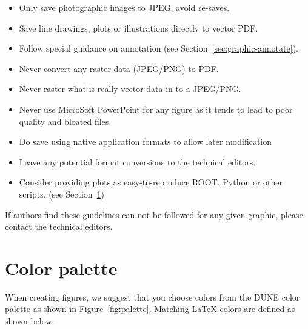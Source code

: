 \begin{itemize}
\item Only save photographic images to JPEG, avoid re-saves.
\item Save line drawings, plots or illustrations directly to vector PDF.
\item Follow special guidance on annotation (see Section~\ref{sec:graphic-annotate}).
\item Never convert any raster data (JPEG/PNG) to PDF.
\item Never raster what is really vector data in to a JPEG/PNG.
\item Never use MicroSoft PowerPoint for any figure as it tends to lead to poor quality and bloated files.
\item Do save using native application formats to allow later
  modification
\item Leave any potential format conversions to the technical editors.
\item Consider providing plots as easy-to-reproduce ROOT, Python or
  other scripts.
  (see Section~\ref{sec:graphic-plots})
\end{itemize}

\noindent If authors find these guidelines can not be followed for any
given graphic, please contact the technical editors.   

\section{Color palette}
\label{sec:graphic-plots}

When creating figures, we suggest that you choose colors from the DUNE color palette as shown in Figure~\ref{fig:palette}. 
Matching \LaTeX{} colors are defined as shown below:

